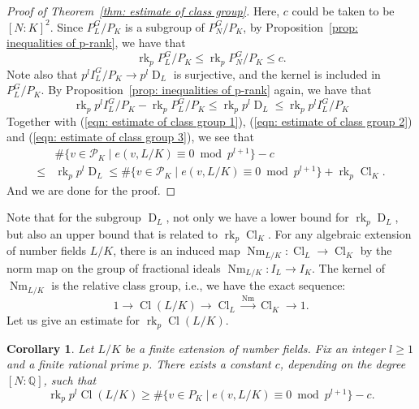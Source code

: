 \documentclass{amsart}
\numberwithin{equation}{section}
\theoremstyle{plain}
\newtheorem{corollary}[theorem]{Corollary}
\theoremstyle{definition}
\theoremstyle{remark}
\begin{document}
\begin{proof}[Proof of Theorem~\ref{thm: estimate of class group}]
        Here, $c$ could be taken to be $[N:K]^2$.
	Since $P_L^G/P_K$ is a subgroup of $P_N^G/P_K$, by Proposition~\ref{prop: inequalities of p-rank}, we have that
	\begin{equation}\label{eqn: estimate of class group 3}
		\operatorname{rk}_p P_L^G/P_K\leq\operatorname{rk}_p P_N^G/P_K\leq c.
	\end{equation}
	Note also that $p^{l}I_L^G/P_K\to p^{l}\operatorname{D}_L$ is surjective, and the kernel is included in $P_L^G/P_K$.
	By Proposition~\ref{prop: inequalities of p-rank} again, we have that
	\begin{equation*}
		\operatorname{rk}_p p^{l}I_L^G/P_K-\operatorname{rk}_p P_L^G/P_K
		\leq\operatorname{rk}_p p^{l}\operatorname{D}_L
		\leq\operatorname{rk}_p p^{l}I_L^G/P_K	
	\end{equation*}
	Together with (\ref{eqn: estimate of class group 1}), (\ref{eqn: estimate of class group 2}) and (\ref{eqn: estimate of class group 3}), we see that
	\begin{equation*}
		\begin{aligned}
			&\#\{v\in\mathcal{P}_K\mid e(v,L/K)\equiv0\bmod{p^{l+1}}\}-c
			\\
			\leq&\operatorname{rk}_p p^{l}\operatorname{D}_L
			\leq\#\{v\in\mathcal{P}_K\mid e(v,L/K)\equiv0\bmod{p^{l+1}}\}+\operatorname{rk}_p\operatorname{Cl}_K.
		\end{aligned}		
	\end{equation*}
	And we are done for the proof.
\end{proof}
Note that for the subgroup $\operatorname{D}_L$, not only we have a lower bound for $\operatorname{rk}_p\operatorname{D}_L$, but also an upper bound that is related to $\operatorname{rk}_p\operatorname{Cl}_{K}$.
For any algebraic extension of number fields $L/K$, there is an induced map $\operatorname{Nm}_{L/K}:\operatorname{Cl}_L\to\operatorname{Cl}_K$ by the norm map on the group of fractional ideals $\operatorname{Nm}_{L/K}:I_L\to I_K$.
The kernel of $\operatorname{Nm}_{L/K}$ is the relative class group, i.e., we have the exact sequence:
\begin{equation*}
	1\to\operatorname{Cl}(L/K)\to\operatorname{Cl}_L\stackrel{\operatorname{Nm}}{\longrightarrow}\operatorname{Cl}_K\to1.
\end{equation*}
Let us give an estimate for $\operatorname{rk}_p\operatorname{Cl}(L/K)$.
\begin{corollary}\label{cor: estimate of rel class group}
    Let $L/K$ be a finite extension of number fields.
    Fix an integer $l\geq1$ and a finite rational prime $p$.
    There exists a constant $c$, depending on the degree $[N:\mathbb{Q}]$, such that
	\begin{equation*}
		\operatorname{rk}_p p^{l}\operatorname{Cl}(L/K)\geq\#\{v\in P_K\mid e(v,L/K)\equiv0\bmod{p^{l+1}}\}-c.
	\end{equation*}
\end{corollary}
\end{document}
